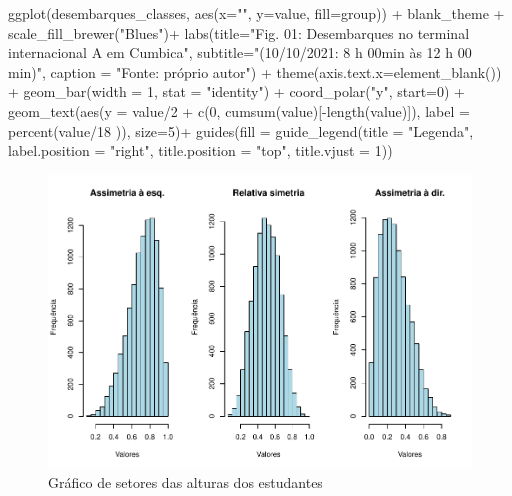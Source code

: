 \documentclass[
]{book}
\newenvironment{Shaded}{\begin{snugshade}}{\end{snugshade}}
\newcommand{\AttributeTok}[1]{\textcolor[rgb]{0.77,0.63,0.00}{#1}}
\newcommand{\DecValTok}[1]{\textcolor[rgb]{0.00,0.00,0.81}{#1}}
\newcommand{\FunctionTok}[1]{\textcolor[rgb]{0.00,0.00,0.00}{#1}}
\newcommand{\NormalTok}[1]{#1}
\newcommand{\SpecialCharTok}[1]{\textcolor[rgb]{0.00,0.00,0.00}{#1}}
\newcommand{\StringTok}[1]{\textcolor[rgb]{0.31,0.60,0.02}{#1}}
\begin{document}
\begin{Shaded}
\begin{Highlighting}[]
\FunctionTok{ggplot}\NormalTok{(desembarques\_classes, }\FunctionTok{aes}\NormalTok{(}\AttributeTok{x=}\StringTok{""}\NormalTok{, }\AttributeTok{y=}\NormalTok{value, }\AttributeTok{fill=}\NormalTok{group)) }\SpecialCharTok{+}
\NormalTok{  blank\_theme }\SpecialCharTok{+}
  \FunctionTok{scale\_fill\_brewer}\NormalTok{(}\StringTok{"Blues"}\NormalTok{)}\SpecialCharTok{+}
  \FunctionTok{labs}\NormalTok{(}\AttributeTok{title=}\StringTok{"Fig. 01: Desembarques no terminal internacional A em Cumbica"}\NormalTok{, }
          \AttributeTok{subtitle=}\StringTok{"(10/10/2021: 8 h 00min às 12 h 00 min)"}\NormalTok{,}
           \AttributeTok{caption =} \StringTok{"Fonte: próprio autor"}\NormalTok{) }\SpecialCharTok{+}
  \FunctionTok{theme}\NormalTok{(}\AttributeTok{axis.text.x=}\FunctionTok{element\_blank}\NormalTok{()) }\SpecialCharTok{+}
  \FunctionTok{geom\_bar}\NormalTok{(}\AttributeTok{width =} \DecValTok{1}\NormalTok{, }\AttributeTok{stat =} \StringTok{"identity"}\NormalTok{) }\SpecialCharTok{+}
  \FunctionTok{coord\_polar}\NormalTok{(}\StringTok{"y"}\NormalTok{, }\AttributeTok{start=}\DecValTok{0}\NormalTok{) }\SpecialCharTok{+}
  \FunctionTok{geom\_text}\NormalTok{(}\FunctionTok{aes}\NormalTok{(}\AttributeTok{y =}\NormalTok{ value}\SpecialCharTok{/}\DecValTok{2} \SpecialCharTok{+} \FunctionTok{c}\NormalTok{(}\DecValTok{0}\NormalTok{, }\FunctionTok{cumsum}\NormalTok{(value)[}\SpecialCharTok{{-}}\FunctionTok{length}\NormalTok{(value)]),}
                \AttributeTok{label =} \FunctionTok{percent}\NormalTok{(value}\SpecialCharTok{/}\DecValTok{18}\NormalTok{ )), }\AttributeTok{size=}\DecValTok{5}\NormalTok{)}\SpecialCharTok{+}
  \FunctionTok{guides}\NormalTok{(}\AttributeTok{fill =} \FunctionTok{guide\_legend}\NormalTok{(}\AttributeTok{title =} \StringTok{"Legenda"}\NormalTok{,}
                             \AttributeTok{label.position =} \StringTok{"right"}\NormalTok{,}
                             \AttributeTok{title.position =} \StringTok{"top"}\NormalTok{, }\AttributeTok{title.vjust =} \DecValTok{1}\NormalTok{)) }
\end{Highlighting}
\end{Shaded}

\begin{figure}
\includegraphics[width=0.8\linewidth]{apostila_files/figure-latex/unnamed-chunk-41-1} \caption{Gráfico de setores das alturas dos estudantes}\label{fig:unnamed-chunk-41}
\end{figure}
\end{document}
